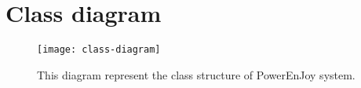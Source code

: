 \section{Class diagram}

\begin{figure}[H]
	\centering
	\texttt{[image: class-diagram]}
	\caption[Class diagram]{This diagram represent the class structure of PowerEnJoy system.}
	\label{fig:class-diagram}
\end{figure}